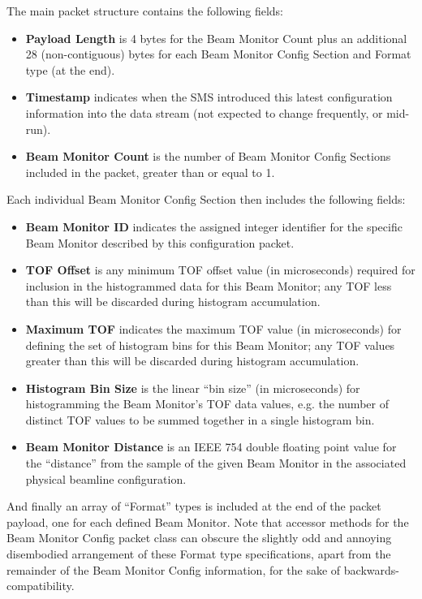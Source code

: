 The main packet structure contains the following fields:
\begin{itemize}
\item{\bf Payload Length} is 4 bytes for the Beam Monitor Count
plus an additional 28 (non-contiguous) bytes
for each Beam Monitor Config Section and Format type (at the end).
\item{\bf Timestamp} indicates when the SMS introduced this latest
configuration information into the data stream (not expected to
change frequently, or mid-run).
\item{\bf Beam Monitor Count} is the number of Beam Monitor
Config Sections included in the packet,
greater than or equal to 1.
\end{itemize}

Each individual Beam Monitor Config Section then includes the
following fields:
\begin{itemize}
\item{\bf Beam Monitor ID} indicates the assigned integer identifier for
the specific Beam Monitor described by this configuration packet.
\item{\bf TOF Offset} is any minimum TOF offset value (in microseconds)
required for inclusion in the histogrammed data for this Beam Monitor;
any TOF less than this will be discarded during histogram accumulation.
\item{\bf Maximum TOF} indicates the maximum TOF value (in microseconds)
for defining the set of histogram bins for this Beam Monitor; any TOF
values greater than this will be discarded during histogram accumulation.
\item{\bf Histogram Bin Size} is the linear ``bin size'' (in microseconds)
for histogramming the Beam Monitor's TOF data values,
e.g. the number of distinct TOF values to be summed together in a single
histogram bin.
\item{\bf Beam Monitor Distance} is an IEEE 754 double floating point
value for the ``distance'' from the sample of the given Beam Monitor in
the associated physical beamline configuration.
\end{itemize}

And finally an array of ``Format'' types is included
at the end of the packet payload,
one for each defined Beam Monitor.
Note that accessor methods for the Beam Monitor Config packet class
can obscure the slightly odd and annoying disembodied arrangement
of these Format type specifications,
apart from the remainder of the Beam Monitor Config information,
for the sake of backwards-compatibility.

